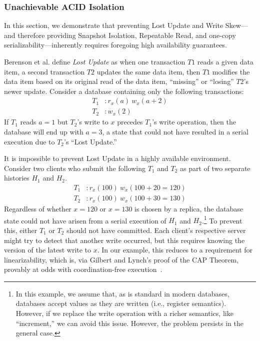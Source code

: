 \subsubsection{Unachievable ACID Isolation}
\label{sec:unachievable-acid}

In this section, we demonstrate that preventing Lost Update and Write
Skew---and therefore providing Snapshot Isolation, Repeatable Read,
and one-copy serializability---inherently requires foregoing high
availability guarantees.

Berenson et al. define \textit{Lost Update} as when one
transaction $T1$ reads a given data item, a second transaction $T2$
updates the same data item, then $T1$ modifies the data item based on
its original read of the data item, ``missing'' or ``losing'' $T2$'s
newer update. Consider a database containing only the following
transactions:
\begin{align*}
T_1 &: r_x(a)~w_x(a+2)
\\T_2 &: w_x(2)
\end{align*}
If $T_1$ reads $a=1$ but $T_2$'s write to $x$ precedes $T_1$'s write
operation, then the database will end up with $a=3$, a state that
could not have resulted in a serial execution due to $T_2$'s
``Lost Update.''

It is impossible to prevent Lost Update in a highly available
environment. Consider two clients who submit the following $T_1$ and
$T_2$ as part of two separate histories $H_1$ and $H_2$.
\begin{align*}
T_1 &: r_x(100)~w_x(100+20=120)
\\T_2 &: r_x(100)~w_x(100+30=130)
\end{align*}
Regardless of whether $x=120$ or $x=130$ is chosen by a replica, the
database state could not have arisen from a serial execution of $H_1$
and $H_2$.\footnote{In this example, we assume that, as is standard in
  modern databases, databases accept values as they are written (i.e.,
  register semantics). However, if we replace the write operation with
  a richer semantics, like ``increment,'' we can avoid this
  issue. However, the problem persists in the general case.}  To
prevent this, either $T_1$ or $T_2$ should not have committed. Each
client's respective server might try to detect that another write
occurred, but this requires knowing the version of the latest write to
$x$. In our example, this reduces to a requirement for
linearizability, which is, via Gilbert and Lynch's proof of the CAP
Theorem, provably at odds with coordination-free
execution~\cite{gilbert-cap}.

